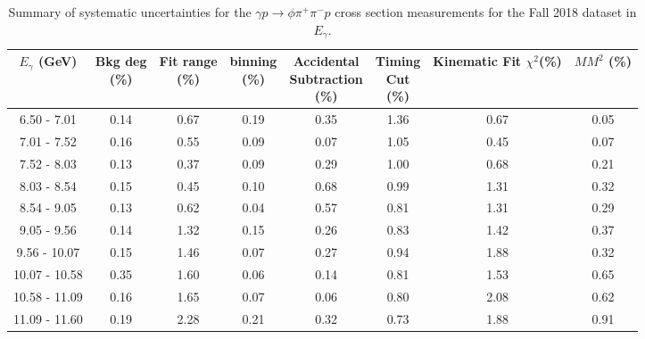 \begin{table}[!htbp]
    \small
    \centering
    \caption{Summary of systematic uncertainties for the $\gamma p \rightarrow \phi \pi^{+} \pi^{-} p$ cross section measurements for the Fall 2018 dataset in $E_{\gamma}$.}
    \label{tab.syserr.phi2pi.4.1}
    \begin{tabular}{|c|c|c|c|c|c|c|c|}
        \hline
        $E_{\gamma}$ (GeV)&\thead{Bkg deg\\(\%)}&\thead{Fit range\\(\%)}&\thead{binning\\(\%)}&\thead{Accidental\\Subtraction\\(\%)}&\thead{Timing\\Cut\\(\%)}&\thead{Kinematic\\Fit $\chi^{2}$(\%)}&\thead{$MM^{2}$\\(\%)}\\
        \hline
        6.50 - 7.01 & 0.14 & 0.67 & 0.19 & 0.35 & 1.36 & 0.67 & 0.05 \\ 
        7.01 - 7.52 & 0.16 & 0.55 & 0.09 & 0.07 & 1.05 & 0.45 & 0.07 \\ 
        7.52 - 8.03 & 0.13 & 0.37 & 0.09 & 0.29 & 1.00 & 0.68 & 0.21 \\ 
        8.03 - 8.54 & 0.15 & 0.45 & 0.10 & 0.68 & 0.99 & 1.31 & 0.32 \\ 
        8.54 - 9.05 & 0.13 & 0.62 & 0.04 & 0.57 & 0.81 & 1.31 & 0.29 \\ 
        9.05 - 9.56 & 0.14 & 1.32 & 0.15 & 0.26 & 0.83 & 1.42 & 0.37 \\ 
        9.56 - 10.07 & 0.15 & 1.46 & 0.07 & 0.27 & 0.94 & 1.88 & 0.32 \\ 
        10.07 - 10.58 & 0.35 & 1.60 & 0.06 & 0.14 & 0.81 & 1.53 & 0.65 \\ 
        10.58 - 11.09 & 0.16 & 1.65 & 0.07 & 0.06 & 0.80 & 2.08 & 0.62 \\ 
        11.09 - 11.60 & 0.19 & 2.28 & 0.21 & 0.32 & 0.73 & 1.88 & 0.91 \\
        \hline
    \end{tabular}
\end{table}

